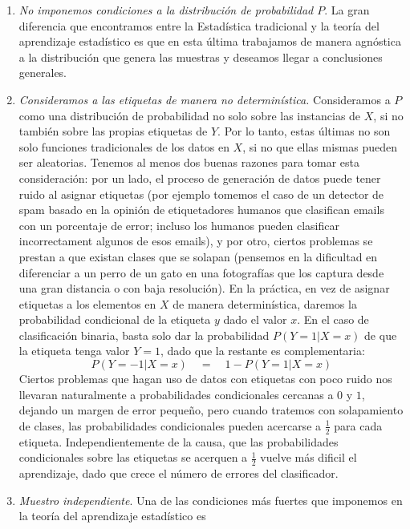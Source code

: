 \documentclass{report}
\begin{document}
\begin{enumerate}
    \item \textit{No imponemos condiciones a la distribución de probabilidad $P$}. La gran diferencia que encontramos entre la Estadística
    tradicional y la teoría del aprendizaje estadístico es que en esta última trabajamos de manera agnóstica a la distribución
    que genera las muestras y deseamos llegar a conclusiones generales.
    \item \textit{Consideramos a las etiquetas de manera no determinística.} Consideramos a $P$ como una distribución de probabilidad
    no solo sobre las instancias de $X$, si no también sobre las propias etiquetas de $Y$. Por lo tanto, estas últimas no son solo 
    funciones tradicionales de los datos en $X$, si no que ellas mismas pueden ser aleatorias. Tenemos al menos dos buenas razones
    para tomar esta consideración: por un lado, el proceso de generación de datos puede tener ruido al asignar etiquetas (por ejemplo
    tomemos el caso de un detector de spam basado en la opinión de etiquetadores humanos que clasifican emails con un porcentaje de error; incluso
    los humanos pueden clasificar incorrectament algunos de esos emails), y por otro, ciertos problemas se prestan a que existan
    clases que se solapan (pensemos en la dificultad en diferenciar a un perro de un gato en una fotografías que los captura desde
    una gran distancia o con baja resolución).\newline
    En la práctica, en vez de asignar etiquetas a los elementos en $X$ de manera determinística, daremos la probabilidad condicional
    de la etiqueta $y$ dado el valor $x$. En el caso de clasificación binaria, basta solo dar la probabilidad $P(Y=1|X=x)$ de que la etiqueta
    tenga valor $Y=1$, dado que la restante es complementaria:
    \[
    P(Y=-1|X=x) \quad = \quad 1 - P(Y=1|X=x)
    \]
    Ciertos problemas que hagan uso de datos con etiquetas con poco ruido nos llevaran naturalmente a probabilidades condicionales cercanas
    a $0$ y $1$, dejando un margen de error pequeño, pero cuando tratemos con solapamiento de clases, las probabilidades condicionales
    pueden acercarse a $\frac{1}{2}$ para cada etiqueta. Independientemente de la causa, que las probabilidades condicionales sobre
    las etiquetas se acerquen a $\frac{1}{2}$ vuelve más dificil el aprendizaje, dado que crece el número de errores del clasificador.
    \item \textit{Muestro independiente}. Una de las condiciones más fuertes que imponemos en la teoría del aprendizaje estadístico es

\end{enumerate}
\end{document}
